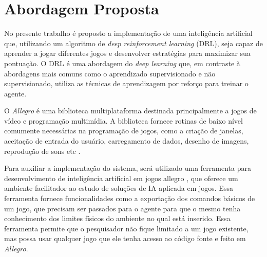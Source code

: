 \chapter{Abordagem Proposta}

No presente trabalho é proposto a implementação de uma inteligência artificial que, utilizando um algoritmo de \textit{deep reinforcement learning} (DRL), seja capaz de aprender a jogar diferentes jogos e desenvolver estratégias para maximizar sua pontuação. O DRL é uma abordagem do \textit{deep learning} que, em contraste à abordagens mais comuns como o aprendizado supervisionado e não supervisionado, utiliza as técnicas de aprendizagem por reforço para treinar o agente.

O \textit{Allegro} é uma biblioteca multiplataforma destinada principalmente a jogos de vídeo e programação multimídia. A biblioteca fornece rotinas de baixo nível comumente necessárias na programação de jogos, como a criação de janelas, aceitação de entrada do usuário, carregamento de dados, desenho de imagens, reprodução de sons etc \cite{allegro}.

Para auxiliar a implementação do sistema, será utilizado uma ferramenta para desenvolvimento de inteligência artificial em jogos allegro \cite{silva:amb-jd-allegro}, que oferece um ambiente facilitador ao estudo de soluções de IA aplicada em jogos. Essa ferramenta fornece funcionalidades como a exportação dos comandos básicos de um jogo, que precisam ser passados para o agente para que o mesmo tenha conhecimento dos limites físicos do ambiente no qual está inserido. Essa ferramenta permite que o pesquisador não fique limitado a um jogo existente, mas possa usar qualquer jogo que ele tenha acesso ao código fonte e feito em \textit{Allegro}.
